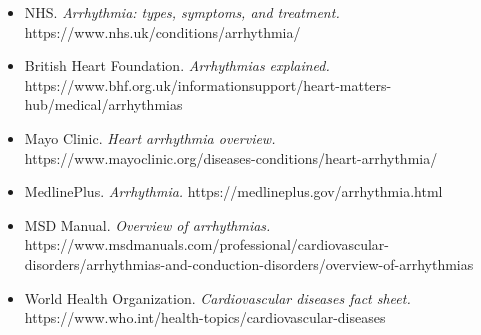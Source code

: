 \begin{itemize}
    \item NHS. \textit{Arrhythmia: types, symptoms, and treatment.} https://www.nhs.uk/conditions/arrhythmia/
    \item British Heart Foundation. \textit{Arrhythmias explained.} https://www.bhf.org.uk/informationsupport/heart-matters-hub/medical/arrhythmias
    \item Mayo Clinic. \textit{Heart arrhythmia overview.} https://www.mayoclinic.org/diseases-conditions/heart-arrhythmia/
    \item MedlinePlus. \textit{Arrhythmia.} https://medlineplus.gov/arrhythmia.html
    \item MSD Manual. \textit{Overview of arrhythmias.} https://www.msdmanuals.com/professional/cardiovascular-disorders/arrhythmias-and-conduction-disorders/overview-of-arrhythmias
    \item World Health Organization. \textit{Cardiovascular diseases fact sheet.} https://www.who.int/health-topics/cardiovascular-diseases
\end{itemize}
